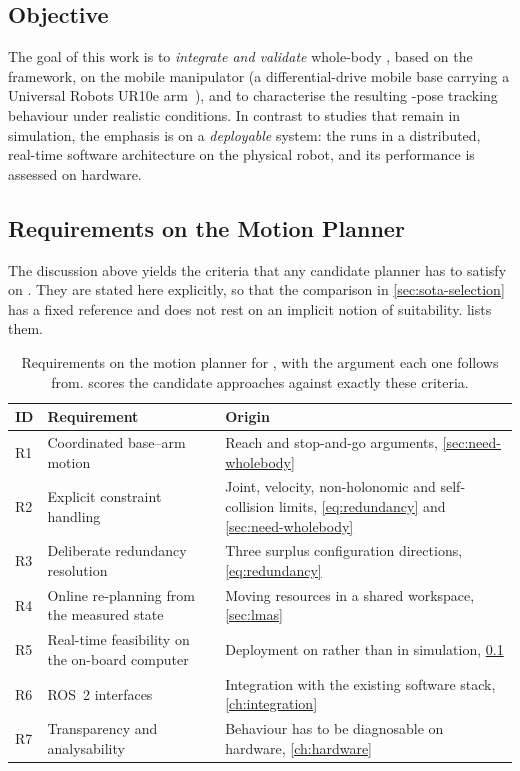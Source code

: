 \subsection{Objective}
\label{sec:obj-goal}
The goal of this work is to \emph{integrate and validate} whole-body
\mpc{}, based on the \ocs{} framework, on the \hero{} mobile
manipulator (a differential-drive mobile base carrying a Universal
Robots UR10e arm~\cite{UR10e}), and to characterise the resulting
\ee{}-pose tracking behaviour under realistic conditions. In contrast to
studies that remain in simulation, the emphasis is on a
\emph{deployable} system: the \mpc{} runs in a distributed, real-time
software architecture on the physical robot, and its performance is
assessed on hardware.

\subsection{Requirements on the Motion Planner}
\label{sec:requirements}
The discussion above yields the criteria that any candidate planner has
to satisfy on \hero{}. They are stated here explicitly, so that the
comparison in \cref{sec:sota-selection} has a fixed reference and does
not rest on an implicit notion of suitability. 
lists them.

\begin{table}[htbp]
  \centering
  \caption[Requirements on the motion planner for \hero{}]{%
    Requirements on the motion planner for \hero{}, with the argument
    each one follows from.  scores the
    candidate approaches against exactly these criteria.}
  \label{tab:requirements}
  \begin{tabularx}{\linewidth}{@{}llX@{}}
    \toprule
    ID & Requirement & Origin \\
    \midrule
    R1 & Coordinated base--arm motion
       & Reach and stop-and-go arguments, \cref{sec:need-wholebody} \\
    R2 & Explicit constraint handling
       & Joint, velocity, non-holonomic and self-collision limits,
         \cref{eq:redundancy} and \cref{sec:need-wholebody} \\
    R3 & Deliberate redundancy resolution
       & Three surplus configuration directions, \cref{eq:redundancy} \\
    R4 & Online re-planning from the measured state
       & Moving resources in a shared workspace, \cref{sec:lmas} \\
    R5 & Real-time feasibility on the on-board computer
       & Deployment on \hero{} rather than in simulation,
         \cref{sec:obj-goal} \\
    R6 & ROS~2 interfaces
       & Integration with the existing \hero{} software stack,
         \cref{ch:integration} \\
    R7 & Transparency and analysability
       & Behaviour has to be diagnosable on hardware,
         \cref{ch:hardware} \\
    \bottomrule
  \end{tabularx}
\end{table}

